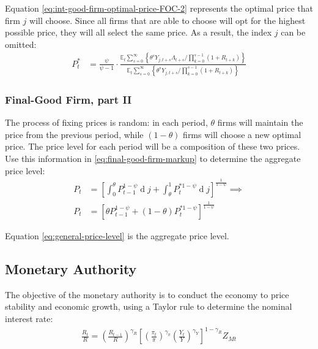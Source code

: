 \documentclass[
	12pt, 
	]{article}
\numberwithin{equation}{section}
\DeclareMathOperator{\dif}{d}
\newcommand{\E}[1][t]{{\mathbb{E}_{#1}}}
\theoremstyle{definition}
\theoremstyle{plain}
\theoremstyle{plain}
\theoremstyle{plain}
\begin{document}

Equation \ref{eq:int-good-firm-optimal-price-FOC-2} represents the optimal price that firm $j$ will choose. Since all firms that are able to choose will opt for the highest possible price, they will all select the same price. As a result, the index $j$ can be omitted:
\begin{align}
\label{eq:int-good-firm-optimal-price-FOC-3}
	P_t^\ast &= 
\frac{\psi}{\psi-1} \cdot
\frac{
	\E \sum_{s=0}^{\infty} \left\{ 
	\theta^s Y_{j,t+s} \Lambda_{t+s} / \prod_{k=0}^{s-1}(1+R_{t+k}) \right\} } {\E \sum_{s=0}^{\infty} \left\{
	\theta^s Y_{j,t+s} / \prod_{k=0}^{s-1}(1+R_{t+k}) \right\}}
\end{align}


\subsubsection{Final-Good Firm, part II}

The process of fixing prices is random: in each period, $\theta$ firms will maintain the price from the previous period, while $(1-\theta)$ firms will choose a new optimal price. The price level for each period will be a composition of these two prices. Use this information in \ref{eq:final-good-firm-markup} to determine the aggregate price level:
\begin{align}
	P_t & = \left[ \int_{0}^{\theta} P_{t-1}^{1-\psi} \dif j + \int_{\theta}^{1} P_t^{\ast 1-\psi} \dif j \right]^{\frac{1}{1-\psi}}  \implies \nonumber \\
	P_t & = \left[ \theta P_{t-1}^{1-\psi} + (1-\theta) P_t^{\ast 1-\psi} \right]^\frac{1}{1-\psi} \label{eq:general-price-level}
\end{align}

Equation \ref{eq:general-price-level} is the aggregate price level.


\subsection{Monetary Authority}

The objective of the monetary authority is to conduct the economy to price stability and economic growth, using a Taylor rule \cite{taylor_discretion_1993} to determine the nominal interest rate:
\begin{align}
\label{eq:monetary-policy}
	\frac{R_t}{R} =
	\left( \frac{R_{t-1}}{R} \right)^{\gamma_R}  \left[
	\left( \frac{\pi_t}{\pi} \right)^{\gamma_\pi}
	\left( \frac{Y_t}{Y} \right)^{\gamma_Y} \right]^{1-\gamma_R} Z_{Mt}
\end{align}
\end{document}
